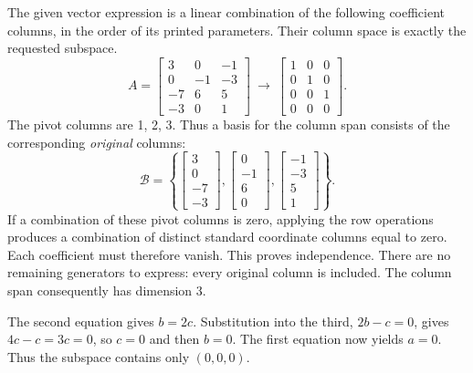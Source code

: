 The given vector expression is a linear combination of the following coefficient columns, in the order of its printed parameters. Their column space is exactly the requested subspace.
\[A=\left[\begin{array}{rrr}3&0&-1\\0&-1&-3\\-7&6&5\\-3&0&1\end{array}\right]\ \longrightarrow\ \left[\begin{array}{rrr}1&0&0\\0&1&0\\0&0&1\\0&0&0\end{array}\right].\]
The pivot columns are 1, 2, 3. Thus a basis for the column span consists of the corresponding \emph{original} columns:
\[\mathcal B=\left\{\left[\begin{array}{r}3\\0\\-7\\-3\end{array}\right],\left[\begin{array}{r}0\\-1\\6\\0\end{array}\right],\left[\begin{array}{r}-1\\-3\\5\\1\end{array}\right]\right\}.\]
If a combination of these pivot columns is zero, applying the row operations produces a combination of distinct standard coordinate columns equal to zero. Each coefficient must therefore vanish. This proves independence. There are no remaining generators to express: every original column is included. The column span consequently has dimension $3$.

The second equation gives $b=2c$. Substitution into the third,
$2b-c=0$, gives $4c-c=3c=0$, so $c=0$ and then $b=0$.
The first equation now yields $a=0$. Thus the subspace contains only
$(0,0,0)$.

